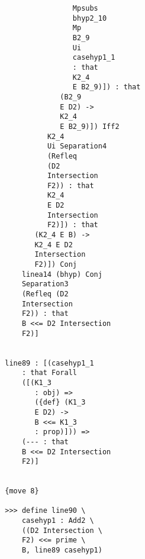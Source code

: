\documentclass[12pt]{article}
\begin{document}
\begin{verbatim}
                                           Mpsubs 
                                           bhyp2_10 
                                           Mp 
                                           B2_9 
                                           Ui 
                                           casehyp1_1 
                                           : that 
                                           K2_4 
                                           E B2_9)]) : that 
                                        (B2_9 
                                        E D2) -> 
                                        K2_4 
                                        E B2_9)]) Iff2 
                                     K2_4 
                                     Ui Separation4 
                                     (Refleq 
                                     (D2 
                                     Intersection 
                                     F2)) : that 
                                     K2_4 
                                     E D2 
                                     Intersection 
                                     F2)]) : that 
                                  (K2_4 E B) -> 
                                  K2_4 E D2 
                                  Intersection 
                                  F2)]) Conj 
                               linea14 (bhyp) Conj 
                               Separation3 
                               (Refleq (D2 
                               Intersection 
                               F2)) : that 
                               B <<= D2 Intersection 
                               F2)]


                           line89 : [(casehyp1_1 
                               : that Forall 
                               ([(K1_3 
                                  : obj) => 
                                  ({def} (K1_3 
                                  E D2) -> 
                                  B <<= K1_3 
                                  : prop)])) => 
                               (--- : that 
                               B <<= D2 Intersection 
                               F2)]


                           {move 8}

                           >>> define line90 \
                               casehyp1 : Add2 \
                               ((D2 Intersection \
                               F2) <<= prime \
                               B, line89 casehyp1)



\end{verbatim}
\end{document}
